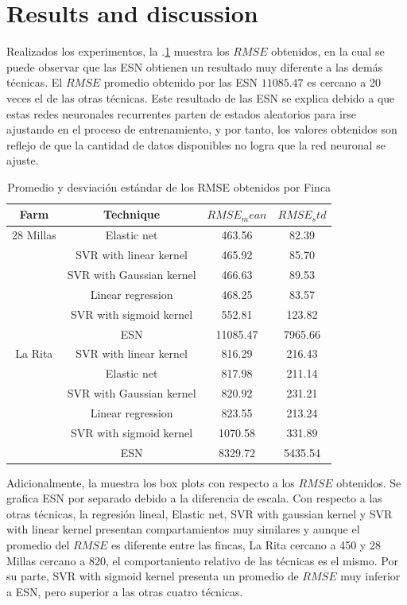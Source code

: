 \section{Results and discussion}
\label{sec:results}

Realizados los experimentos, la \tablename $.$\ref{tabla2} muestra los $RMSE$ obtenidos, en la cual se puede observar que las ESN obtienen un resultado muy diferente a las demás técnicas. El $RMSE$ promedio obtenido por las ESN $11085.47$ es cercano a 20 veces el de las otras técnicas. Este resultado de las ESN se explica debido a que estas redes neuronales recurrentes parten de estados aleatorios para irse ajustando en el proceso de entrenamiento, y por tanto, los valores obtenidos son reflejo de que la cantidad de datos disponibles no logra que la red neuronal se ajuste.
%
\begin{table}[h] 
\caption{Promedio y desviación estándar de los RMSE obtenidos por Finca} 
\label{tabla2} 
\centering
\begin{tabular}{c|c|c|c} 
\hline
\bfseries Farm & \bfseries Technique & \bfseries $RMSE_mean$ & \bfseries $RMSE_std$\\ 
\hline\hline 
28 Millas  	& Elastic net  & 463.56	& 	82.39  \\
			& SVR with linear kernel  & 465.92  & 85.70  \\
			& SVR with Gaussian kernel  & 466.63 & 89.53  \\						
			& Linear regression  & 468.25 & 83.57  \\									
			& SVR with sigmoid kernel & 552.81 & 123.82  \\									
			& ESN  & 11085.47 &  7965.66 \\												
\hline 
La Rita  	& SVR with linear kernel  & 816.29	& 	216.43  \\
			& Elastic net   &  817.98 &  211.14 \\
			& SVR with Gaussian kernel  & 820.92 & 231.21  \\						
			& Linear regression  & 823.55 &  213.24 \\									
			& SVR with sigmoid kernel & 1070.58 &  331.89 \\									
			& ESN  & 8329.72 & 5435.54  \\												
\hline    
\end{tabular} 
\end{table}
%
Adicionalmente, la  muestra los box plots con respecto a los $RMSE$ obtenidos. Se grafica ESN por separado debido a la diferencia de escala. Con respecto a las otras técnicas, la regresión lineal, Elastic net, SVR with gaussian kernel y SVR with linear kernel presentan compartamientos muy similares y aunque el promedio del $RMSE$ es diferente entre las fincas, La Rita cercano a 450 y 28 Millas cercano a 820, el comportaniento relativo de las técnicas es el mismo. Por su parte, SVR with sigmoid kernel presenta un promedio de $RMSE$ muy inferior a ESN, pero superior a las otras cuatro técnicas.
